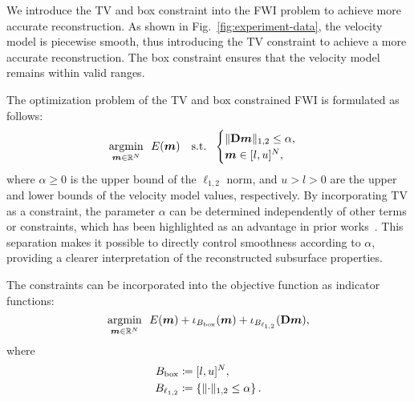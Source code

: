 %

We introduce the TV and box constraint into the FWI problem to achieve more accurate reconstruction.
As shown in Fig.~\ref{fig:experiment-data}, the velocity model is piecewise smooth, thus introducing the TV constraint to achieve a more accurate reconstruction.
The box constraint ensures that the velocity model remains within valid ranges.

The optimization problem of the TV and box constrained FWI is formulated as follows:
\begin{equation} \label{eq:FWIObjectiveWithTVConstraint} \argmin{\velModel \in \realNumber^N} \ \ \FWIObjectiveWithTVConstraint \end{equation}
where $\alpha \ge 0$ is the upper bound of the $\ell_{1,2}$ norm, and $u > l > 0$ are the upper and lower bounds of the velocity model values, respectively.
By incorporating TV as a constraint, the parameter $\alpha$ can be determined independently of other terms or constraints, which has been highlighted as an advantage in prior works~\cite{constraint0,constraint1,constraint2,constraint3,constraint4,constraints-vs-penalties-in-FWI}.
This separation makes it possible to directly control smoothness according to $\alpha$, providing a clearer interpretation of the reconstructed subsurface properties.

The constraints can be incorporated into the objective function as indicator functions:
\begin{equation} \label{eq:FWIObjectiveWithTVConstraintWithIndicatorFunction} \argmin{\velModel \in \realNumber^N} \ \ \FWIObjectiveWithTVConstraintWithIndicatorFunction, \end{equation}
where
\begin{equation}
    \label{eq:LOneTwoBallDefinition}
    \begin{aligned}[b]
        \BoxBall & \coloneqq [l,u]^N, \\
        \LOneTwoBall & \coloneqq \LOneTwoBallSetDefinition.
    \end{aligned}
\end{equation}


